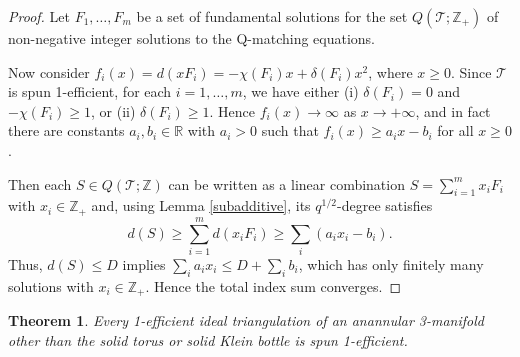 \documentclass[12pt,reqno]{amsart}  %
\newtheorem{thm}{Theorem}[section]
\theoremstyle{definition}
\theoremstyle{remark}
\def\R{\mathbb{R}}
\newcommand{\T}{\mathcal{T}}
\def\Z{\mathbb Z}
\begin{document}
\begin{proof} 
Let $F_1, \ldots, F_m$ be a set of fundamental solutions for the set 
$Q(\T;\Z_+)$ of non-negative integer solutions to the Q-matching equations.   

Now consider $f_i(x) = d(x F_i) = -\chi(F_i)x+\delta(F_i) x^2$, where $x \ge 0$.
Since $\T$ is spun 1-efficient, for each $i=1,\ldots,m$, we have either
(i) $\delta(F_i)=0$ and $-\chi(F_i) \ge 1$, or (ii) $\delta(F_i) \ge 1$.
Hence $f_i(x) \to \infty$ as $x \to +\infty$, and in fact there are 
constants $a_i,b_i \in \R$ with $a_i >0$ such that
$f_i(x) \ge a_i x - b_i$ for all $x \ge 0$.

Then each $S\in Q(\T;\Z)$ can be written as a linear combination 
$S= \sum_{i=1}^m x_i F_i$ with $x_i \in \Z_+$
and, using Lemma \ref{subadditive},  its $q^{1/2}$-degree satisfies 
$$
d(S) \ge \sum_{i=1}^m d(x_i F_i) \ge \sum_i (a_i x_i -b_i).
$$
Thus, $d(S) \le D$ implies $\sum_i a_i x_i \le D + \sum_i b_i$,
which has only finitely many solutions with $x_i \in \Z_+$. Hence the total
index sum converges.
\end{proof}

\begin{thm}
Every 1-efficient ideal triangulation of an anannular 3-manifold other 
than the solid torus or solid Klein bottle is spun 1-efficient. 
\end{thm}
\end{document}
